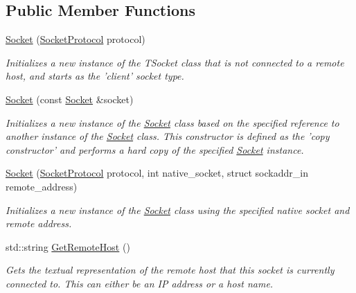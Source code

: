 \subsection*{Public Member Functions}
\begin{DoxyCompactItemize}
\item 
\hyperlink{class_senergy_1_1_socket_a6fcb47adc585aa2bb5d3d81a5e5b22e1}{Socket} (\hyperlink{class_senergy_1_1_socket_ad400245278746ac26e261bdda171c178}{Socket\-Protocol} protocol)
\begin{DoxyCompactList}\small\item\em Initializes a new instance of the T\-Socket class that is not connected to a remote host, and starts as the 'client' socket type. \end{DoxyCompactList}\item 
\hyperlink{class_senergy_1_1_socket_ad287e0ea5d32febd95ed7ba590d9e08d}{Socket} (const \hyperlink{class_senergy_1_1_socket}{Socket} \&socket)
\begin{DoxyCompactList}\small\item\em Initializes a new instance of the \hyperlink{class_senergy_1_1_socket}{Socket} class based on the specified reference to another instance of the \hyperlink{class_senergy_1_1_socket}{Socket} class. This constructor is defined as the 'copy constructor' and performs a hard copy of the specified \hyperlink{class_senergy_1_1_socket}{Socket} instance. \end{DoxyCompactList}\item 
\hyperlink{class_senergy_1_1_socket_ad6ac199d691bbbb3915c375900a11ca7}{Socket} (\hyperlink{class_senergy_1_1_socket_ad400245278746ac26e261bdda171c178}{Socket\-Protocol} protocol, int native\-\_\-socket, struct sockaddr\-\_\-in remote\-\_\-address)
\begin{DoxyCompactList}\small\item\em Initializes a new instance of the \hyperlink{class_senergy_1_1_socket}{Socket} class using the specified native socket and remote address. \end{DoxyCompactList}\item 
std\-::string \hyperlink{class_senergy_1_1_socket_aaab6b46c9e2733982df87eefb0fc77a2}{Get\-Remote\-Host} ()
\begin{DoxyCompactList}\small\item\em Gets the textual representation of the remote host that this socket is currently connected to. This can either be an I\-P address or a host name. \end{DoxyCompactList}\item 

\end{DoxyCompactItemize}
